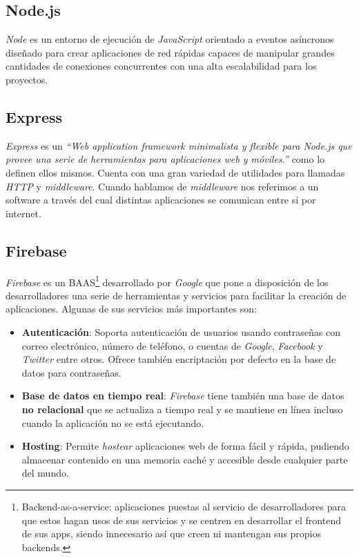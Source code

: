 \subsection{Node.js}
\textit{Node}\cite{nodejs} es un entorno de ejecución de \textit{JavaScript} orientado a eventos asíncronos diseñado para crear aplicaciones de red rápidas capaces de manipular grandes cantidades de conexiones concurrentes con una alta escalabilidad para los proyectos.

\subsection{Express}
\textit{Express}\cite{express} es un \textit{``Web application framework minimalista y flexible para Node.js que provee una serie de herramientas para aplicaciones web y móviles.''} como lo definen ellos mismos. Cuenta con una gran variedad de utilidades para llamadas \textit{HTTP} y \textit{middleware}. Cuando hablamos de \textit{middleware} nos referimos a un software a través del cual distintas aplicaciones se comunican entre sí por internet. 

\subsection{Firebase}
\textit{Firebase}\cite{firebase} es un BAAS\footnote{Backend-as-a-service: aplicaciones puestas al servicio de desarrolladores para que estos hagan usos de sus servicios y se centren en desarrollar el frontend de sus apps, siendo innecesario así que creen ni mantengan sus propios backends.} desarrollado por \textit{Google} que pone a disposición de los desarrolladores una serie de herramientas y servicios para facilitar la creación de aplicaciones. Algunas de sus servicios más importantes son:

\begin{itemize}
    \item \textbf{Autenticación}: Soporta autenticación de usuarios usando contraseñas con correo electrónico, número de teléfono, o cuentas de \textit{Google}, \textit{Facebook} y \textit{Twitter} entre otros. Ofrece también encriptación por defecto en la base de datos para contraseñas.
    \item \textbf{Base de datos en tiempo real}: \textit{Firebase} tiene también una base de datos \textbf{no relacional} que se actualiza a tiempo real y se mantiene en línea incluso cuando la aplicación no se está ejecutando.
    \item \textbf{Hosting}: Permite \textit{hostear} aplicaciones web de forma fácil y rápida, pudiendo almacenar contenido en una memoria caché y accesible desde cualquier parte del mundo.
\end{itemize}

